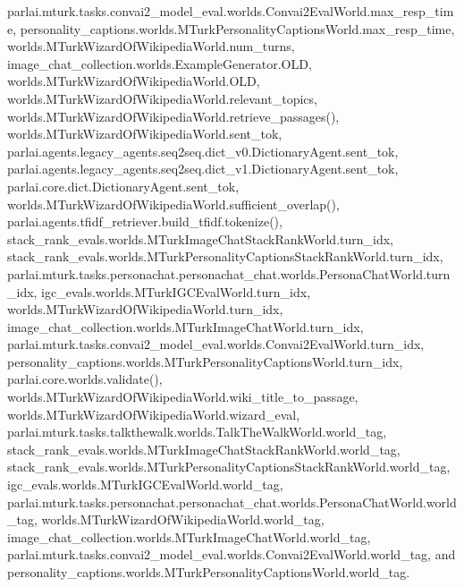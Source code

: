 parlai.\+mturk.\+tasks.\+convai2\+\_\+model\+\_\+eval.\+worlds.\+Convai2\+Eval\+World.\+max\+\_\+resp\+\_\+time, personality\+\_\+captions.\+worlds.\+M\+Turk\+Personality\+Captions\+World.\+max\+\_\+resp\+\_\+time, worlds.\+M\+Turk\+Wizard\+Of\+Wikipedia\+World.\+num\+\_\+turns, image\+\_\+chat\+\_\+collection.\+worlds.\+Example\+Generator.\+O\+LD, worlds.\+M\+Turk\+Wizard\+Of\+Wikipedia\+World.\+O\+LD, worlds.\+M\+Turk\+Wizard\+Of\+Wikipedia\+World.\+relevant\+\_\+topics, worlds.\+M\+Turk\+Wizard\+Of\+Wikipedia\+World.\+retrieve\+\_\+passages(), worlds.\+M\+Turk\+Wizard\+Of\+Wikipedia\+World.\+sent\+\_\+tok, parlai.\+agents.\+legacy\+\_\+agents.\+seq2seq.\+dict\+\_\+v0.\+Dictionary\+Agent.\+sent\+\_\+tok, parlai.\+agents.\+legacy\+\_\+agents.\+seq2seq.\+dict\+\_\+v1.\+Dictionary\+Agent.\+sent\+\_\+tok, parlai.\+core.\+dict.\+Dictionary\+Agent.\+sent\+\_\+tok, worlds.\+M\+Turk\+Wizard\+Of\+Wikipedia\+World.\+sufficient\+\_\+overlap(), parlai.\+agents.\+tfidf\+\_\+retriever.\+build\+\_\+tfidf.\+tokenize(), stack\+\_\+rank\+\_\+evals.\+worlds.\+M\+Turk\+Image\+Chat\+Stack\+Rank\+World.\+turn\+\_\+idx, stack\+\_\+rank\+\_\+evals.\+worlds.\+M\+Turk\+Personality\+Captions\+Stack\+Rank\+World.\+turn\+\_\+idx, parlai.\+mturk.\+tasks.\+personachat.\+personachat\+\_\+chat.\+worlds.\+Persona\+Chat\+World.\+turn\+\_\+idx, igc\+\_\+evals.\+worlds.\+M\+Turk\+I\+G\+C\+Eval\+World.\+turn\+\_\+idx, worlds.\+M\+Turk\+Wizard\+Of\+Wikipedia\+World.\+turn\+\_\+idx, image\+\_\+chat\+\_\+collection.\+worlds.\+M\+Turk\+Image\+Chat\+World.\+turn\+\_\+idx, parlai.\+mturk.\+tasks.\+convai2\+\_\+model\+\_\+eval.\+worlds.\+Convai2\+Eval\+World.\+turn\+\_\+idx, personality\+\_\+captions.\+worlds.\+M\+Turk\+Personality\+Captions\+World.\+turn\+\_\+idx, parlai.\+core.\+worlds.\+validate(), worlds.\+M\+Turk\+Wizard\+Of\+Wikipedia\+World.\+wiki\+\_\+title\+\_\+to\+\_\+passage, worlds.\+M\+Turk\+Wizard\+Of\+Wikipedia\+World.\+wizard\+\_\+eval, parlai.\+mturk.\+tasks.\+talkthewalk.\+worlds.\+Talk\+The\+Walk\+World.\+world\+\_\+tag, stack\+\_\+rank\+\_\+evals.\+worlds.\+M\+Turk\+Image\+Chat\+Stack\+Rank\+World.\+world\+\_\+tag, stack\+\_\+rank\+\_\+evals.\+worlds.\+M\+Turk\+Personality\+Captions\+Stack\+Rank\+World.\+world\+\_\+tag, igc\+\_\+evals.\+worlds.\+M\+Turk\+I\+G\+C\+Eval\+World.\+world\+\_\+tag, parlai.\+mturk.\+tasks.\+personachat.\+personachat\+\_\+chat.\+worlds.\+Persona\+Chat\+World.\+world\+\_\+tag, worlds.\+M\+Turk\+Wizard\+Of\+Wikipedia\+World.\+world\+\_\+tag, image\+\_\+chat\+\_\+collection.\+worlds.\+M\+Turk\+Image\+Chat\+World.\+world\+\_\+tag, parlai.\+mturk.\+tasks.\+convai2\+\_\+model\+\_\+eval.\+worlds.\+Convai2\+Eval\+World.\+world\+\_\+tag, and personality\+\_\+captions.\+worlds.\+M\+Turk\+Personality\+Captions\+World.\+world\+\_\+tag.

